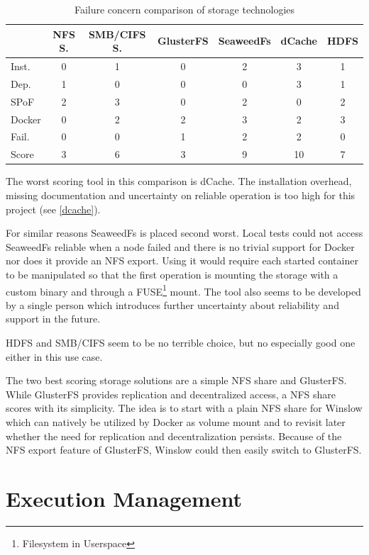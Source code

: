 \begin{table}[H]
	\begin{tabular}{|l|c|c|c|c|c|c|}\hline
				& NFS S.& SMB/CIFS S.& GlusterFS & SeaweedFs	& dCache 	& HDFS \\
		\hline
		Inst. 	& 0 	& 1 		& 0 		& 2 		& 3			& 1 \\
		Dep. 	& 1 	& 0			& 0 		& 0 		& 3 		& 1 \\
		SPoF 	& 2		& 3			& 0			& 2 		& 0			& 2 \\
		Docker 	& 0 	& 2 		& 2 		& 3 		& 2 		& 3 \\
		Fail.	& 0		& 0			& 1			& 2			& 2			& 0 \\
		\hline \hline
		Score 	& 3		& 6			& 3			& 9			& 10		& 7 \\ \hline
	\end{tabular}
	\caption{Failure concern comparison of storage technologies}
	\label{comparision:storage}
\end{table}

The worst scoring tool in this comparison is dCache.
The installation overhead, missing documentation and uncertainty on reliable operation is too high for this project (see \autoref{dcache}).

For similar reasons SeaweedFs is placed second worst.
Local tests could not access SeaweedFs reliable when a node failed and there is no trivial support for Docker nor does it provide an NFS export.
Using it would require each started container to be manipulated so that the first operation is mounting the storage with a custom binary and through a FUSE\footnote{Filesystem in Userspace} mount.
The tool also seems to be developed by a single person which introduces further uncertainty about reliability and support in the future.

HDFS and SMB/CIFS seem to be no terrible choice, but no especially good one either in this use case.

The two best scoring storage solutions are a simple NFS share and GlusterFS.
While GlusterFS provides replication and decentralized access, a NFS share scores with its simplicity.
The idea is to start with a plain NFS share for Winslow which can natively be utilized by Docker as volume mount and to revisit later whether the need for replication and decentralization persists.
Because of the NFS export feature of GlusterFS, Winslow could then easily switch to GlusterFS.



\section{Execution Management}

